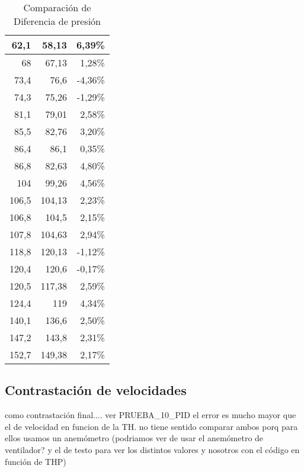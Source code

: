 \begin{table}[h!]
\begin{tabular}{|r|r|r}
			62,1 & 58,13 & \multicolumn{1}{r|}{6,39\%} \\ \hline
			68 & 67,13 & \multicolumn{1}{r|}{1,28\%} \\ \hline
			73,4 & 76,6 & \multicolumn{1}{r|}{-4,36\%} \\ \hline
			74,3 & 75,26 & \multicolumn{1}{r|}{-1,29\%} \\ \hline
			81,1 & 79,01 & \multicolumn{1}{r|}{2,58\%} \\ \hline
			85,5 & 82,76 & \multicolumn{1}{r|}{3,20\%} \\ \hline
			86,4 & 86,1 & \multicolumn{1}{r|}{0,35\%} \\ \hline
			86,8 & 82,63 & \multicolumn{1}{r|}{4,80\%} \\ \hline
			104 & 99,26 & \multicolumn{1}{r|}{4,56\%} \\ \hline
			106,5 & 104,13 & \multicolumn{1}{r|}{2,23\%} \\ \hline
			106,8 & 104,5 & \multicolumn{1}{r|}{2,15\%} \\ \hline
			107,8 & 104,63 & \multicolumn{1}{r|}{2,94\%} \\ \hline
			118,8 & 120,13 & \multicolumn{1}{r|}{-1,12\%} \\ \hline
			120,4 & 120,6 & \multicolumn{1}{r|}{-0,17\%} \\ \hline
			120,5 & 117,38 & \multicolumn{1}{r|}{2,59\%} \\ \hline
			124,4 & 119 & \multicolumn{1}{r|}{4,34\%} \\ \hline
			140,1 & 136,6 & \multicolumn{1}{r|}{2,50\%} \\ \hline
			147,2 & 143,8 & \multicolumn{1}{r|}{2,31\%} \\ \hline
			152,7 & 149,38 & \multicolumn{1}{r|}{2,17\%} \\ \hline
		\end{tabular}
	\caption{Comparación de Diferencia de presión}
	\label{difpres}

\end{table}

\subsection{Contrastación de velocidades}
como contrastación final....
ver PRUEBA\_10\_PID
el error es mucho mayor que el de velocidad en funcion de la TH. no tiene sentido comparar ambos porq para ellos usamos  un anemómetro (podriamos ver de usar el anemómetro de ventilador? y el de testo para ver los distintos valores y nosotros con el código en función de THP)

